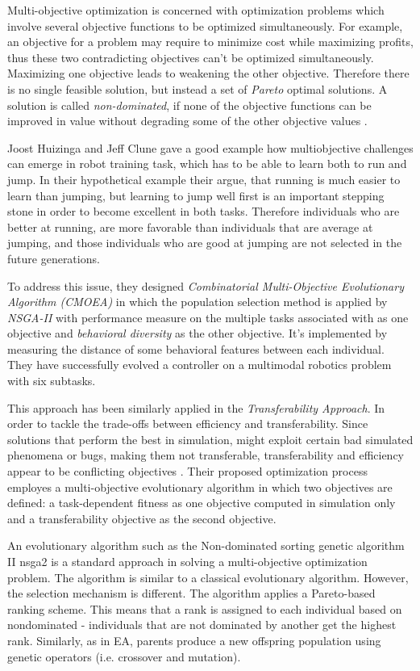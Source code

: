 Multi-objective optimization is concerned with optimization problems which involve several objective functions to be optimized simultaneously. For example, an objective for a problem may require to minimize cost while maximizing profits, thus these two contradicting objectives can't be optimized simultaneously. Maximizing one objective leads to weakening the other objective. Therefore there is no single feasible solution, but instead a set of \emph{Pareto} optimal solutions.  A solution is called \emph{non-dominated}, if none of the objective functions can be improved in value without degrading some of the other objective values \cite{deb2014multi}.

Joost Huizinga and Jeff Clune gave a good example \cite{Huizinga2018EvolvingMR} how multiobjective challenges can emerge in robot training task, which has to be able to learn both to run and jump. In their hypothetical example their argue, that running is much easier to learn than jumping, but learning to jump well first is an important stepping stone in order to become excellent in both tasks. Therefore individuals who are better at running, are more favorable than individuals that are average at jumping, and those individuals who are good at jumping are not selected in the future generations.

To address this issue, they designed \emph{Combinatorial Multi-Objective Evolutionary Algorithm (CMOEA)} in which the population selection method is applied by \emph{NSGA-II} with performance measure on the multiple tasks associated with as one objective and \emph{behavioral diversity} \cite{behavioraldiversity} as the other objective. It's implemented by measuring the distance of some behavioral features between each individual. They have successfully evolved a controller on a multimodal robotics problem with six subtasks.

This approach has been similarly applied in the \emph{Transferability Approach}. In order to tackle the trade-offs between efficiency and transferability. Since solutions that perform the best in simulation, might exploit certain bad simulated phenomena or bugs, making them not transferable, transferability and efficiency appear to be conflicting objectives \cite{koos2012transferability}. Their proposed optimization process employes a multi-objective evolutionary algorithm in which two objectives are defined: a task-dependent fitness as one objective computed in simulation only and a transferability objective as the second objective. 

An evolutionary algorithm such as the Non-dominated sorting genetic algorithm II \gls{nsga2} \cite{deb200fast} is a standard approach in solving a multi-objective optimization problem. The algorithm is similar to a classical evolutionary algorithm. However, the selection mechanism is different. The algorithm applies a Pareto-based ranking scheme. This means that a rank is assigned to each individual based on nondominated - individuals that are not dominated by another get the highest rank. Similarly, as in EA, parents produce a new offspring population using genetic operators (i.e. crossover and mutation).

